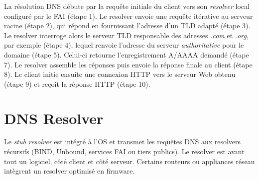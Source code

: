 \documentclass[a4paper, 14pt]{report}
\begin{document}
\noindent La résolution DNS débute par la requête initiale du client
vers son \textit{resolver} local configuré par le FAI (étape 1).
Le resolver envoie une requête itérative au serveur racine
(étape 2), qui répond en fournissant l’adresse d’un TLD adapté (étape 3).
Le resolver interroge alors le serveur TLD responsable des 
adresses \textit{.com} et \textit{.org}, par exemple (étape 4),
lequel renvoie l’adresse du serveur \textit{authoritative} pour le domaine
(étape 5). Celui-ci retourne l’enregistrement A/AAAA demandé (étape 7). Le
resolver assemble les réponses puis envoie la réponse finale au client
(étape 8). Le client initie ensuite une connexion HTTP vers le serveur Web
obtenu (étape 9) et reçoit la réponse HTTP (étape 10).

\section{DNS Resolver}
    Le \textit{stub resolver} est intégré à l’OS et transmet les
    requêtes DNS aux resolvers récursifs (BIND, Unbound, services
    FAI ou tiers publics).  Le resolver est avant tout un logiciel, côté client
    et côté serveur. Certains routeurs ou appliances réseau
    intègrent un resolver optimisé en firmware.
\end{document}
